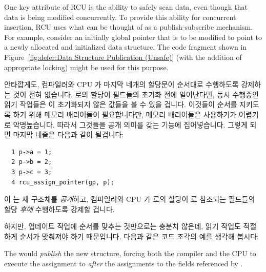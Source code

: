 One key attribute of RCU is the ability to safely scan data, even
though that data is being modified concurrently.
To provide this ability for concurrent insertion,
RCU uses what can be thought of as a publish-subscribe mechanism.
For example, consider an initially  global pointer
 that is to be modified to point to a newly allocated
and initialized data structure.
The code fragment shown in
Figure~\ref{fig:defer:Data Structure Publication (Unsafe)}
(with the addition of appropriate locking)
might be used for this purpose.
\fi

안타깝게도, 컴파일러와 CPU 가 마지막 네개의 할당문이 순서대로 수행하도록
강제하는 것이 전혀 없습니다.
 로의 할당이  필드들의 초기화 전에 일어난다면, 동시 수행중인 읽기
작업들은 이 초기화되지 않은 값들을 볼 수 있을 겁니다.
이것들이 순서를 지키도록 하기 위해 메모리 배리어들이 필요합니다만, 메모리
배리어들은 사용하기가 어렵기로 악명높습니다.
따라서 그것들을 공개 의미를 갖는  기능에 집어넣습니다.
그렇게 되면 마지막 네줄은 다음과 같이 될겁니다:

\vspace{5pt}
\begin{minipage}[t]{\columnwidth}
\scriptsize
\begin{verbatim}
  1 p->a = 1;
  2 p->b = 2;
  3 p->c = 3;
  4 rcu_assign_pointer(gp, p);
\end{verbatim}
\end{minipage}
\vspace{5pt}

이  는 새 구조체를 \emph{공개}하고, 컴파일러와 CPU 가
 로의 할당이  로 참조되는 필드들의 할당 \emph{후에} 수행하도록
강제할 겁니다.

하지만, 업데이트 작업에 순서를 맞추는 것만으로는 충분치 않은데, 읽기 작업도
적절하게 순서가 맞춰져야 하기 때문입니다.
다음과 같은 코드 조각의 예를 생각해 봅시다:
\iffalse

The 
would \emph{publish} the new structure, forcing both the compiler
and the CPU to execute the assignment to  \emph{after}
the assignments to the fields referenced by .

